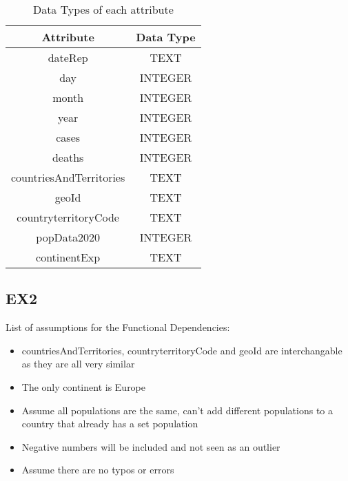 \documentclass[]{article}
\begin{document}
\begin{table}[h]
\centering
\begin{tabular}{ |c|c| }
    \hline
    \textbf{Attribute} & \textbf{Data Type}\\
    \hline
    dateRep & TEXT\\
    day & INTEGER\\
    month & INTEGER\\
    year & INTEGER\\
    cases & INTEGER\\
    deaths & INTEGER\\
    countriesAndTerritories & TEXT\\
    geoId & TEXT\\
    countryterritoryCode & TEXT\\
    popData2020 & INTEGER\\
    continentExp & TEXT\\
    \hline
\end{tabular}
\caption{Data Types of each attribute}
\end{table}

\subsection{EX2}

List of assumptions for the Functional Dependencies:

\begin{itemize}
    \item{countriesAndTerritories, countryterritoryCode and geoId are interchangable as they are all very similar}
    \item{The only continent is Europe}
    \item{Assume all populations are the same, can't add different populations to a country that already has a set population}
    \item{Negative numbers will be included and not seen as an outlier}
    \item{Assume there are no typos or errors}
\end{itemize}
\end{document}
